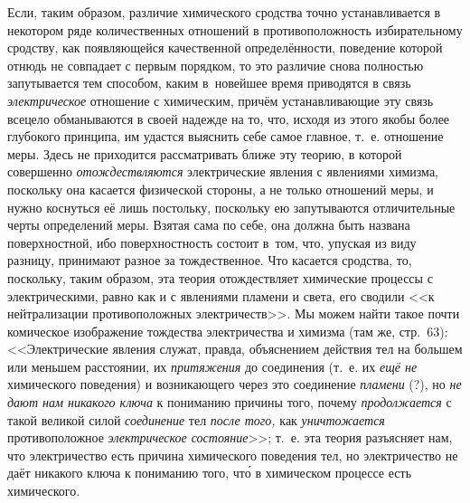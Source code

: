 Если, таким образом, различие химического сродства точно устанавливается в
некотором ряде количественных отношений в противоположность избирательному
сродству, как появляющейся качественной определённости, поведение которой отнюдь не совпадает с первым
порядком, то это различие снова полностью запутывается тем способом, каким
в~новейшее время приводятся в связь {\em электрическое} отношение с химическим,
причём устанавливающие эту связь всецело обманываются в своей надежде на то,
что, исходя из этого якобы более глубокого принципа, им удастся выяснить себе
самое главное, т.~е. отношение меры. Здесь не приходится рассматривать ближе
эту теорию, в которой совершенно {\em отождествляются} электрические явления с
явлениями химизма, поскольку она касается физической стороны, а не только
отношений меры, и нужно коснуться её лишь постольку, поскольку ею запутываются
отличительные черты определений меры. Взятая сама по себе, она должна быть
названа поверхностной, ибо поверхностность состоит в~том, что, упуская из виду
разницу, принимают разное за тождественное. Что касается сродства, то,
поскольку, таким образом, эта теория отождествляет химические процессы с
электрическими, равно как и с явлениями пламени и света, его сводили <<к
нейтрализации противоположных электричеств>>. Мы можем найти такое почти
комическое изображение тождества электричества и химизма (там же, стр.~63):
<<Электрические явления служат, правда, объяснением действия тел на большем или
меньшем расстоянии, их {\em притяжения} до соединения (т.~е. их {\em ещё не}
химического поведения) и возникающего через это соединение {\em пламени} (?),
но {\em не дают нам никакого ключа} к пониманию причины того, почему
{\em продолжается} с такой великой силой {\em соединение} тел {\em после того,}
как {\em уничтожается} противоположное {\em электрическое состояние}>>; т.~е.
эта теория разъясняет нам, что электричество есть причина химического поведения
тел, но электричество не даёт никакого ключа к пониманию того, чт\'{о}
в химическом процессе есть химического.

